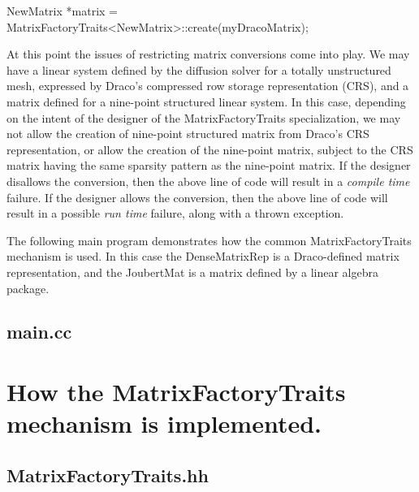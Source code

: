 \documentclass[11pt]{nmemo}
\newcommand{\cxxcode}{\color{codecolor}}
\newcommand{\code}[1]{\textcolor{codecolor}{#1}}
\begin{document}
\begin{ttfamily}
\cxxcode
  NewMatrix *matrix = 
    MatrixFactoryTraits<NewMatrix>::create(myDracoMatrix);
\end{ttfamily}

At this point the issues of restricting matrix conversions come into
play.
We may have a linear system defined by the diffusion
solver for a totally unstructured mesh, expressed by Draco's compressed row
storage representation (CRS), and a matrix defined for a
nine-point structured linear system.
In this case, depending on the intent of the designer of the
\code{MatrixFactoryTraits} specialization,
we may not allow the creation of nine-point structured matrix
from Draco's CRS representation, or allow the creation
of the nine-point matrix, subject to the CRS matrix having the same
sparsity pattern as the nine-point matrix.
If the designer disallows the conversion, then the above line of code
will result in a \emph{compile time} failure.
If the designer allows the conversion, then the above line of code
will result in a possible \emph{run time} failure, along with
a thrown exception.

The following main program demonstrates how the common
\code{MatrixFactoryTraits} mechanism is used.
In this case the \code{DenseMatrixRep} is a Draco-defined matrix
representation, and the \code{JoubertMat} is a matrix defined by a
linear algebra package.

\subsection{main.cc}

\begin{ttfamily}
\begin{small}
\cxxcode

\end{small}
\end{ttfamily}

\section{How the \code{MatrixFactoryTraits} mechanism is implemented.}

\subsection{MatrixFactoryTraits.hh}

\begin{ttfamily}
\begin{small}
\cxxcode

\end{small}
\end{ttfamily}
\end{document}
